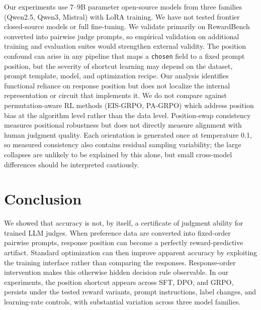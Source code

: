 \documentclass[11pt]{article}
\begin{document}
Our experiments use 7--9B parameter open-source models from three families (Qwen2.5, Qwen3, Mistral) with LoRA training. We have not tested frontier closed-source models or full fine-tuning. We validate primarily on RewardBench converted into pairwise judge prompts, so empirical validation on additional training and evaluation suites would strengthen external validity. The position confound can arise in any pipeline that maps a \texttt{chosen} field to a fixed prompt position, but the severity of shortcut learning may depend on the dataset, prompt template, model, and optimization recipe. Our analysis identifies functional reliance on response position but does not localize the internal representation or circuit that implements it. We do not compare against permutation-aware RL methods (EIS-GRPO, PA-GRPO) which address position bias at the algorithm level rather than the data level. Position-swap consistency measures positional robustness but does not directly measure alignment with human judgment quality. Each orientation is generated once at temperature 0.1, so measured consistency also contains residual sampling variability; the large collapses are unlikely to be explained by this alone, but small cross-model differences should be interpreted cautiously.

\vspace{-0.8em}
\section{Conclusion}

We showed that accuracy is not, by itself, a certificate of judgment ability for trained LLM judges. When preference data are converted into fixed-order pairwise prompts, response position can become a perfectly reward-predictive artifact. Standard optimization can then improve apparent accuracy by exploiting the training interface rather than comparing the responses. Response-order intervention makes this otherwise hidden decision rule observable. In our experiments, the position shortcut appears across SFT, DPO, and GRPO, persists under the tested reward variants, prompt instructions, label changes, and learning-rate controls, with substantial variation across three model families.
\end{document}
